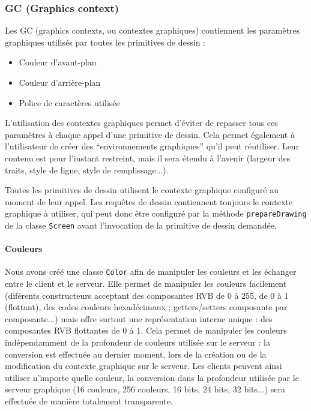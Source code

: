 \subsubsection{GC (Graphics context)}

Les GC (graphics contexts, ou contextes graphiques) contiennent les paramètres graphiques utilisés par toutes les primitives de dessin :
\begin{itemize}
  \item Couleur d'avant-plan
  \item Couleur d'arrière-plan
  \item Police de caractères utilisée
\end{itemize}

\vspace{1em}

L'utilisation des contextes graphiques permet d'éviter de repasser tous ces paramètres à chaque appel d'une primitive de dessin. Cela permet également à l'utilisateur de créer des ``environnements graphiques'' qu'il peut réutiliser. Leur contenu est pour l'instant restreint, mais il sera étendu à l'avenir (largeur des traits, style de ligne, style de remplissage...).

Toutes les primitives de dessin utilisent le contexte graphique configuré au moment de leur appel. Les requêtes de dessin contiennent toujours le contexte graphique à utiliser, qui peut donc être configuré par la méthode \verb|prepareDrawing| de la classe \verb|Screen| avant l'invocation de la primitive de dessin demandée.

\paragraph{Couleurs}
Nous avons créé une classe \verb|Color| afin de manipuler les couleurs et les échanger entre le client et le serveur. Elle permet de manipuler les couleurs facilement (diférents constructeurs acceptant des composantes RVB de 0 à 255, de 0 à 1 (flottant), des codes couleurs hexadécimaux ; getters/setters composante par composante...) mais offre surtout une représentation interne unique : des composantes RVB flottantes de 0 à 1. Cela permet de manipuler les couleurs indépendamment de la profondeur de couleurs utilisée sur le serveur : la conversion est effectuée au dernier moment, lors de la création ou de la modification du contexte graphique sur le serveur. Les clients peuvent ainsi utiliser n'importe quelle couleur, la conversion dans la profondeur utilisée par le serveur graphique (16 couleurs, 256 couleurs, 16 bits, 24 bits, 32 bits...) sera effectuée de manière totalement transparente.

